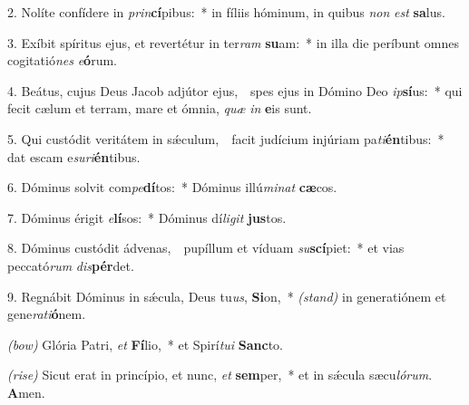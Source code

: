 2. Nolíte confídere in \textit{prin}\textbf{cí}pibus:~* in fíliis hóminum, in quibus \textit{non} \textit{est} \textbf{sa}lus.

3. Exíbit spíritus ejus, et revertétur in ter\textit{ram} \textbf{su}am:~* in illa die períbunt omnes cogitatió\textit{nes} \textit{e}\textbf{ó}rum.

4. Beátus, cujus Deus Jacob adjútor ejus,~\GreDagger\ spes ejus in Dómino Deo \textit{ip}\textbf{sí}us:~* qui fecit cælum et terram, mare et ómnia, \textit{quæ} \textit{in} \textbf{e}is sunt.

5. Qui custódit veritátem in s\'{\ae}culum,~\GreDagger\ facit judícium injúriam pa\textit{ti}\textbf{én}tibus:~* dat escam e\textit{su}\textit{ri}\textbf{én}tibus.

6. Dóminus solvit com\textit{pe}\textbf{dí}tos:~* Dóminus illú\textit{mi}\textit{nat} \textbf{cæ}cos.

7. Dóminus érigit \textit{e}\textbf{lí}sos:~* Dóminus dí\textit{li}\textit{git} \textbf{jus}tos.

8. Dóminus custódit ádvenas,~\GreDagger\ pupíllum et víduam \textit{su}\textbf{scí}piet:~* et vias peccató\textit{rum} \textit{dis}\textbf{pér}det.

9. Regnábit Dóminus in s\'{\ae}cula, Deus tu\textit{us}, \textbf{Si}on,~* {\color{red}\textit{(stand)}} in generatiónem et gene\textit{ra}\textit{ti}\textbf{ó}nem.

{\color{red}\textit{(bow)}} Glória Patri, \textit{et} \textbf{Fí}lio,~* et Spirí\textit{tu}\textit{i} \textbf{Sanc}to.

{\color{red}\textit{(rise)}} Sicut erat in princípio, et nunc, \textit{et} \textbf{sem}per,~* et in s\'{\ae}cula sæcu\textit{ló}\textit{rum}. \textbf{A}men.